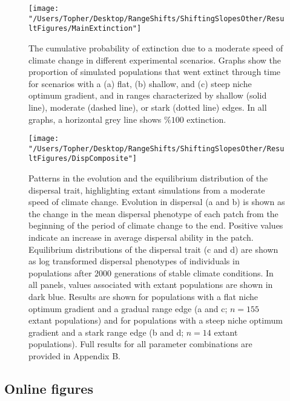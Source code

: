 \documentclass[11pt]{article}
\begin{document}
\clearpage

\begin{figure}[h!]
\texttt{[image: "/Users/Topher/Desktop/RangeShifts/ShiftingSlopesOther/ResultFigures/MainExtinction"]}
\caption{The cumulative probability of extinction due to a moderate speed of climate change in different experimental scenarios. Graphs show the proportion of simulated populations that went extinct through time for scenarios with a (a) flat, (b) shallow, and (c) steep niche optimum gradient, and in ranges characterized by shallow (solid line), moderate (dashed line), or stark (dotted line) edges. In all graphs, a horizontal grey line shows $\%100$ extinction.}
\label{fig:ExtProb}
\end{figure}

\clearpage

\begin{figure}[h!]
\texttt{[image: "/Users/Topher/Desktop/RangeShifts/ShiftingSlopesOther/ResultFigures/DispComposite"]}
\caption{Patterns in the evolution and the equilibrium distribution of the dispersal trait, highlighting extant simulations from a moderate speed of climate change. Evolution in dispersal (a and b) is shown as the change in the mean dispersal phenotype of each patch from the beginning of the period of climate change to the end. Positive values indicate an increase in average dispersal ability in the patch. Equilibrium distributions of the dispersal trait (c and d) are shown as log transformed dispersal phenotypes of individuals in populations after $2000$ generations of stable climate conditions. In all panels, values associated with extant populations are shown in dark blue. Results are shown for populations with a flat niche optimum gradient and a gradual range edge (a and c; $n = 155$ extant populations) and for populations with a steep niche optimum gradient and a stark range edge (b and d; $n = 14$ extant populations). Full results for all parameter combinations are provided in Appendix B.}
\label{fig:Disp}
\end{figure}

\clearpage

\subsection*{Online figures}

\renewcommand{\thefigure}{A\arabic{figure}}
\setcounter{figure}{0}
\end{document}
